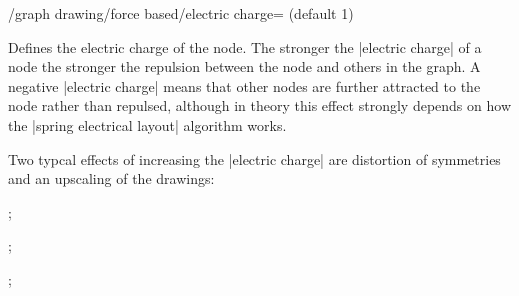 \begin{key}{/graph drawing/force based/electric charge= 
  (default 1)}

  Defines the electric charge of the node. The stronger the 
  |electric charge| of a node the stronger the repulsion between the
  node and others in the graph. A negative |electric charge| means that
  other nodes are further attracted to the node rather than repulsed,
  although in theory this effect strongly depends on how the 
  |spring electrical layout| algorithm works.

  Two typcal effects of increasing the |electric charge| are distortion
  of symmetries and an upscaling of the drawings:
  \begin{codeexample}[width=5cm] 
\tikz {};

\tikz {};

\tikz {};
  \end{codeexample}
\end{key}

